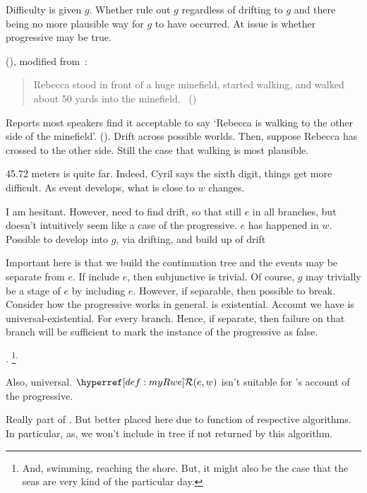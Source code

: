 \begin{note}
  Difficulty is given \(g\).
  Whether rule out \(g\) regardless of drifting to \(g\) and there being no more plausible way for \(g\) to have occurred.
  At issue is whether progressive may be true.

  \citeauthor{Engelberg:1999vi} (\citeyear{Engelberg:1999vi}), modified from~\textcite[475]{Asher:1992ug}:
  \begin{quote}
    Rebecca stood in front of a huge minefield, started walking, and walked about 50 yards into the minefield.%
    \mbox{ }\hfill\mbox{(\citeyear[49]{Engelberg:1999vi})}
  \end{quote}
  Reports most speakers find it acceptable to say `Rebecca is walking to the other side of the minefield'.
  (\citeyear[49]{Engelberg:1999vi}).
  Drift across possible worlds.
  Then, suppose Rebecca has crossed to the other side.
  Still the case that walking is most plausible.

  45.72 meters is quite far.
  Indeed, Cyril says the sixth digit, things get more difficult.
  As event develops, what is close to \(w\) changes.

  I am hesitant.
  However, need to find drift, so that still \(e\) in all branches, but doesn't intuitively seem like a case of the progressive.
  \(e\) has happened in \(w\).
  Possible to develop into \(g\), via drifting, and build up of drift 

  Important here is that we build the continuation tree and the events may be separate from \(e\).
  If include \(e\), then subjunctive is trivial.
  Of course, \(g\) may trivially be a stage of \(e\) by including \(e\).
  However, if separable, then possible to break.
  Consider how the progressive works in general.
  \citeauthor{Landman:1992wh} is existential.
  Account we have is universal-existential.
  For every branch.
  Hence, if separate, then failure on that branch will be sufficient to mark the instance of the progressive as false.

  .%
  \footnote{
    And, swimming, reaching the shore.
    But, it might also be the case that the seas are very kind of the particular day.
  }\(^{,}\)

  Also, universal.
  \(\mRwe{w}{e}\) isn't suitable for \citeauthor{Landman:1992wh}'s account of the progressive.

  Really part of \AlgAC{}.
  But better placed here due to function of respective algorithms.
  In particular, as, we won't include in tree if not returned by this algorithm.
\end{note}

